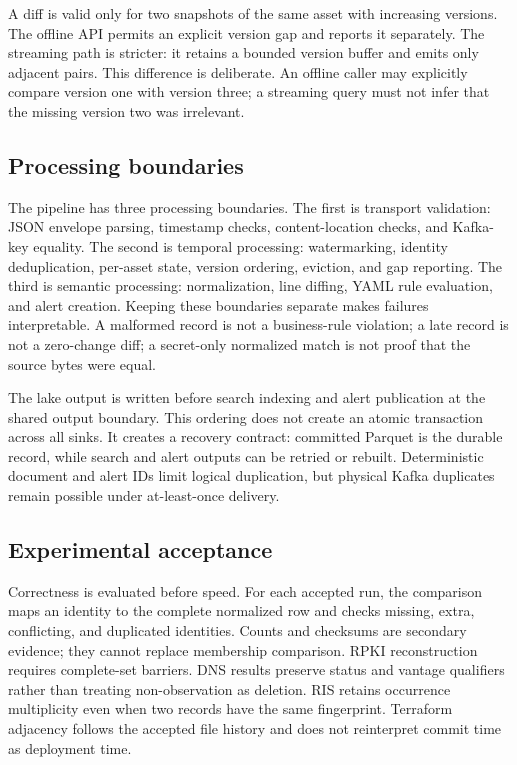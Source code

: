 A diff is valid only for two snapshots of the same asset with increasing versions. The offline API permits an explicit version gap and reports it separately. The streaming path is stricter: it retains a bounded version buffer and emits only adjacent pairs. This difference is deliberate. An offline caller may explicitly compare version one with version three; a streaming query must not infer that the missing version two was irrelevant.

\subsection{Processing boundaries}
The pipeline has three processing boundaries. The first is transport validation: JSON envelope parsing, timestamp checks, content-location checks, and Kafka-key equality. The second is temporal processing: watermarking, identity deduplication, per-asset state, version ordering, eviction, and gap reporting. The third is semantic processing: normalization, line diffing, YAML rule evaluation, and alert creation. Keeping these boundaries separate makes failures interpretable. A malformed record is not a business-rule violation; a late record is not a zero-change diff; a secret-only normalized match is not proof that the source bytes were equal.

The lake output is written before search indexing and alert publication at the shared output boundary. This ordering does not create an atomic transaction across all sinks. It creates a recovery contract: committed Parquet is the durable record, while search and alert outputs can be retried or rebuilt. Deterministic document and alert IDs limit logical duplication, but physical Kafka duplicates remain possible under at-least-once delivery.

\subsection{Experimental acceptance}
Correctness is evaluated before speed. For each accepted run, the comparison maps an identity to the complete normalized row and checks missing, extra, conflicting, and duplicated identities. Counts and checksums are secondary evidence; they cannot replace membership comparison. RPKI reconstruction requires complete-set barriers. DNS results preserve status and vantage qualifiers rather than treating non-observation as deletion. RIS retains occurrence multiplicity even when two records have the same fingerprint. Terraform adjacency follows the accepted file history and does not reinterpret commit time as deployment time.

